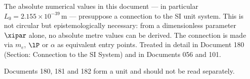 \begin{foundation}
The absolute numerical values in this document — in particular $L_0 = 2{.}155 \times 10^{-39}\,\text{m}$ — presuppose a connection to the SI unit system. This is not circular but epistemologically necessary: from a dimensionless parameter $\xipar$ alone, no absolute metre values can be derived. The connection is made via $m_e$, $\lP$ or $\alpha$ as equivalent entry points. Treated in detail in Document 180 (Section: Connection to the SI System) and in Documents 056 and 101.

Documents 180, 181 and 182 form a unit and should not be read separately.
\end{foundation}
